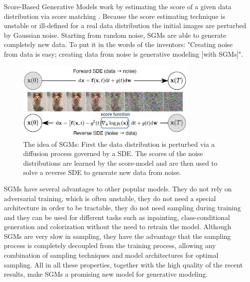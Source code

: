 \thispagestyle{plain}
Score-Based Generative Models work by estimating the score of a given data distribution via score matching \cite{score_matching_original}. Because the score estimating technique is unstable or ill-defined for a real data distribution the initial images are perturbed by Gaussian noise. Starting from random noise, SGMs are able to generate completely new data. To put it in the words of the inventors: "Creating noise from data is easy; creating data from noise is generative modeling [with SGMs]".

\thispagestyle{plain}
%
\begin{figure}[]
    \centering
    \includegraphics[width=0.8\textwidth]{Chapters/figures/sgm.PNG}
    \caption{The idea of SGMs: First the data distribution is perturbed via a diffusion process governed by a SDE. The scores of the noise distributions are learned by the score-model and are then used to solve a reverse SDE to generate new data from noise.}
\end{figure}
%

\thispagestyle{plain}
SGMs have several advantages to other popular models. They do not rely on adversarial training, which is often unstable, they do not need a special architecture in order to be tractable, they do not need sampling during training and they can be used for different tasks such as inpainting, class-conditional generation and colorization without the need to retrain the model. Although SGMs are very slow in sampling, they have the advantage that the sampling process is completely decoupled from the training process, allowing any combination of sampling techniques and model architectures for optimal sampling. All in all these properties, together with the high quality of the recent results, make SGMs a promising new model for generative modeling.
